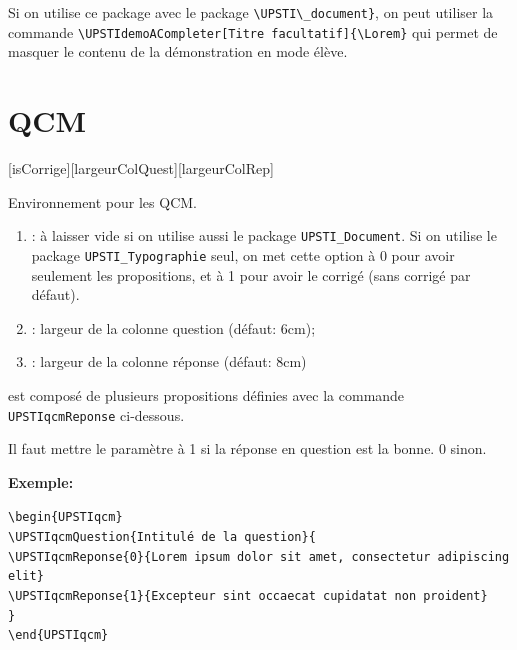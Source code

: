 \documentclass[11pt]{ltxdockit}[2010/09/26]
\newcommand{\Lorem}{Lorem ipsum dolor sit amet consectetuer sed est non lorem euismod.}
\newcommand{\ex}{\noindent \textbf{Exemple:}\quad}
\begin{document}
\noindent Si on utilise ce package avec le package \verb!\UPSTI\_document}!, on peut utiliser la commande \verb!\UPSTIdemoACompleter[Titre facultatif]{\Lorem}! qui permet de masquer le contenu de la démonstration en mode élève.

\section{QCM}
\begin{ltxsyntax}
[isCorrige][largeurColQuest][largeurColRep]
\end{ltxsyntax}

\noindent Environnement pour les QCM.
\begin{enumerate}
\item {}: à laisser vide si on utilise aussi le package \texttt{UPSTI\_Document}. Si on utilise le package \texttt{UPSTI\_Typographie} seul, on met cette option à 0 pour avoir seulement les propositions, et à 1 pour avoir le corrigé (sans corrigé par défaut).
\item {}: largeur de la colonne question (défaut: 6cm);
\item {}: largeur de la colonne réponse (défaut: 8cm)
\end{enumerate}

\begin{ltxsyntax}
\end{ltxsyntax}
 est composé de plusieurs propositions définies avec la commande \verb!UPSTIqcmReponse! ci-dessous.

\begin{ltxsyntax}
\end{ltxsyntax}
Il faut mettre le paramètre  à 1 si la réponse en question est la bonne. 0 sinon.

\vspace{1em}
\ex

\noindent \verb!\begin{UPSTIqcm}!\\
\verb!\UPSTIqcmQuestion{Intitulé de la question}{!\\
\verb!\UPSTIqcmReponse{0}{Lorem ipsum dolor sit amet, consectetur adipiscing elit}!\\
\verb!\UPSTIqcmReponse{1}{Excepteur sint occaecat cupidatat non proident}!\\
\verb!}!\\
\verb!\end{UPSTIqcm}!
\end{document}
